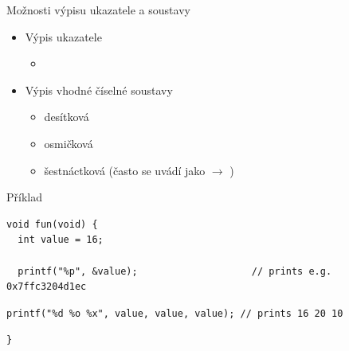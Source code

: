 \begin{frame}[fragile]{Možnosti výpisu ukazatele a soustavy}

  \begin{itemize}
    \item Výpis ukazatele
    \begin{itemize}
      \item {}
    \end{itemize}

    \pause

    \item Výpis vhodné číselné soustavy
    \begin{itemize}
      \item {} desítková
      \item {} osmičková
      \item {} šestnáctková (často se uvádí jako 
        $\rightarrow$ )
    \end{itemize}

  \end{itemize}


\begin{block}{Příklad}
\begin{lstlisting}[belowskip=0pt]
void fun(void) {
  int value = 16;

  printf("%p", &value);                    // prints e.g. 0x7ffc3204d1ec
\end{lstlisting}
\begin{lstlisting}[aboveskip=0pt,belowskip=0pt]
  printf("%d %o %x", value, value, value); // prints 16 20 10
\end{lstlisting}
\begin{lstlisting}[aboveskip=0pt]
}
\end{lstlisting}
\end{block}

\end{frame}

